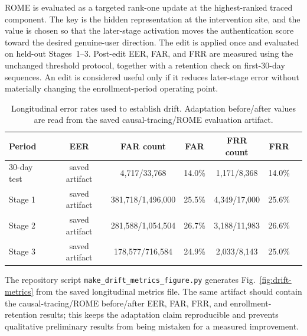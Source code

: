 \documentclass[conference]{IEEEtran}
\begin{document}
ROME is evaluated as a targeted rank-one update at the highest-ranked traced component. The key is the hidden representation at the intervention site, and the value is chosen so that the later-stage activation moves the authentication score toward the desired genuine-user direction. The edit is applied once and evaluated on held-out Stages~1--3. Post-edit EER, FAR, and FRR are measured using the unchanged threshold protocol, together with a retention check on first-30-day sequences. An edit is considered useful only if it reduces later-stage error without materially changing the enrollment-period operating point.

\begin{table}[t]
\centering
\caption{Longitudinal error rates used to establish drift. Adaptation before/after values are read from the saved causal-tracing/ROME evaluation artifact.}
\label{tab:longitudinal-drift}
\scriptsize
\begin{tabular}{lcccccc}
\toprule
Period & EER & FAR count & FAR & FRR count & FRR\\
\midrule
30-day test & saved artifact & 4,717/33,768 & 14.0\% & 1,171/8,368 & 14.0\%\\
Stage 1 & saved artifact & 381,718/1,496,000 & 25.5\% & 4,349/17,000 & 25.6\%\\
Stage 2 & saved artifact & 281,588/1,054,504 & 26.7\% & 3,188/11,983 & 26.6\%\\
Stage 3 & saved artifact & 178,577/716,584 & 24.9\% & 2,033/8,143 & 25.0\%\\
\bottomrule
\end{tabular}
\end{table}

The repository script \texttt{make\_drift\_metrics\_figure.py} generates Fig.~\ref{fig:drift-metrics} from the saved longitudinal metrics file. The same artifact should contain the causal-tracing/ROME before/after EER, FAR, FRR, and enrollment-retention results; this keeps the adaptation claim reproducible and prevents qualitative preliminary results from being mistaken for a measured improvement.

\fi
\end{document}
